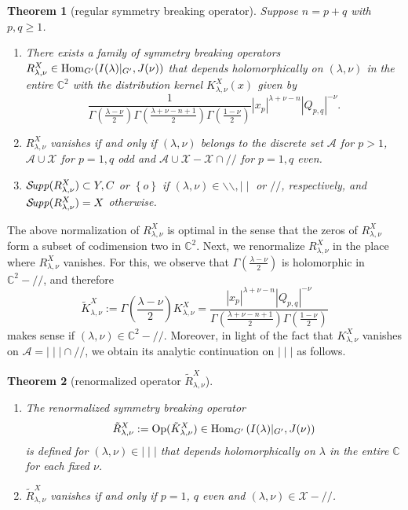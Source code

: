 \documentclass[reqno,12pt]{pja00} %
\newcommand{\myabs}[1]{\left|#1\right|}
\providecommand{\C}{\mathbb{C}}
\newcommand{\Q}{\mathbb{Q}}
\theoremstyle{plain}
\newtheorem{theorem}{Theorem}[section]
\newcommand{\Supp}{\mathcal{S}\!{\it upp}}
\theoremstyle{definition}
\theoremstyle{exampstyle} \newtheorem{examp}[theorem]{Theorem}
\newcommand{\Op}{\mbox{\normalfont Op}}
\renewcommand{\Q}{Q_{p,q}}
\newcommand{\Hom}{\operatorname{Hom}}
\let\setminus-
\begin{document}
\begin{theorem}[regular symmetry breaking operator]\label{thm:regular}
	Suppose $n=p+q$ with $p,q\ge1$.
	\begin{enumerate}[(1)]
		\item There exists a family of symmetry breaking operators $R_{\lambda,\nu}^X\in\Hom_{G'}(I(\lambda)\kern-0.1cm\mid_{G'},J(\nu))$ that depends 
			holomorphically on $(\lambda,\nu)$ in the entire $\C^2$ with the distribution kernel
 $K_{\lambda,\nu}^X(x)$ given by
\begin{equation*}
		\frac{1}{\Gamma\left( \frac{\lambda-\nu}{2}\right)\Gamma\left( \frac{\lambda+\nu-n+1}{2}\right)\Gamma\left( \frac{1-\nu}{2}   \right)}\myabs{x_p}^{\lambda+\nu-n}
		\myabs{\Q}^{-\nu}.
\end{equation*}
\item 
	$R^X_{\lambda,\nu}$ vanishes if and only if $(\lambda,\nu)$ belongs to the discrete set $\mathcal{A}$ for $p>1$, $\mathcal{A}\cup\mathcal{X}$ for $p=1,q$ odd
	and $\mathcal{A}\cup\mathcal{X}-\mathcal{X}\cap//$ for $p=1,q$ even.
\item 
	$\Supp(R_{\lambda,\nu}^X)\subset Y,C$ or $\left\{ o \right\}$ if $(\lambda,\nu)\in\backslash\backslash,\mid\mid$ or $//$, respectively, and $\Supp(R_{\lambda,\nu}^X)=X$
	otherwise.
	\end{enumerate}
\end{theorem}
The above normalization of $R^X_{\lambda,\nu}$ is optimal in the sense that
the zeros of $R^X_{\lambda,\nu}$ form a subset of codimension two in $\mathbb C^2$.
Next, we renormalize $R_{\lambda,\nu}^X$ in the place where
$R_{\lambda,\nu}^X$ vanishes. For this, we observe
that $\Gamma\left( \frac{\lambda-\nu}{2} \right)$ is holomorphic in $\C^2\setminus //$,
 and therefore
\begin{equation*}
	\tilde{K}_{\lambda,\nu}^X:=\Gamma( \frac{\lambda-\nu}{2})K_{\lambda,\nu}^X
	=\frac{\myabs{x_p}^{\lambda+\nu-n}\myabs{\Q}^{-\nu}}{\Gamma\left( \frac{\lambda+\nu-n+1}{2} \right)\Gamma\left( \frac{1-\nu}{2} \right)}
\end{equation*}
makes sense if $(\lambda,\nu)\in\C^2\setminus //$. 
Moreover, in light of the fact that $K_{\lambda,\nu}^X$ vanishes 
on $\mathcal{A}=\mid\mid\mid\cap//$,
we obtain its analytic continuation on $\mid\mid\mid$ as follows.
\begin{theorem}[renormalized operator $\tilde{R}_{\lambda,\nu}^X$]
	\begin{enumerate}[(1)]
		\item The renormalized symmetry breaking operator
\begin{equation*}
	\tilde{R}_{\lambda,\nu}^X:=\Op(\tilde{K}_{\lambda,\nu}^X)\in\Hom_{G'}\left( I(\lambda)\kern-0.1cm\mid_{G'},J(\nu) \right)
\end{equation*}
is defined for $(\lambda,\nu)\in\mid\mid\mid$ that depends holomorphically 
			on $\lambda$ in the entire $\C$ for each fixed $\nu$.
		\item $\tilde{R}^X_{\lambda,\nu}$ vanishes if and only if $p=1$, $q$ even and $(\lambda,\nu)\in\mathcal{X}\setminus//$.
	\end{enumerate}
	\label{thm:X2}
\end{theorem}
\end{document}
